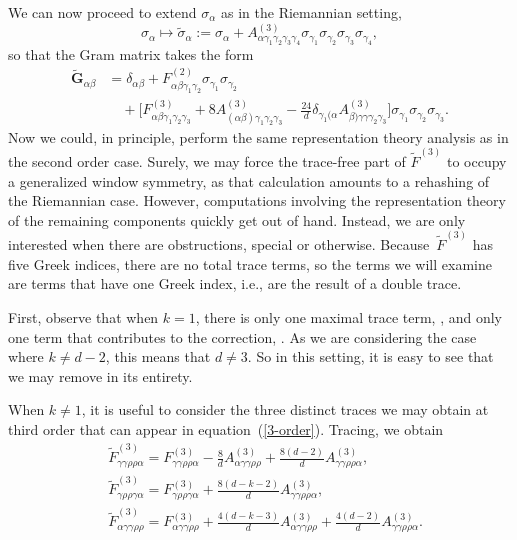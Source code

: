 \documentclass[10pt,a4paper]{article}
\numberwithin{equation}{section}
\newcommand{\bG}{\boldsymbol{G}}
\renewcommand{\=}{\stackrel \Lambda =}
\begin{document}
We can now proceed to extend $\sigma_{\alpha}$ as in the Riemannian setting,
\[\sigma_{\alpha} \mapsto \tilde{\sigma}_{\alpha} := \sigma_{\alpha} + A^{(3)}_{\alpha \gamma_1 \gamma_2 \gamma_3 \gamma_4} \sigma_{\gamma_1} \sigma_{\gamma_2} \sigma_{\gamma_3} \sigma_{\gamma_4} ,\]
so that the Gram matrix takes the form
\begin{align}
\tilde{\bG}_{\alpha \beta} &{}= \delta_{\alpha \beta}+ F^{(2)}_{\alpha \beta \gamma_1 \gamma_2} \sigma_{\gamma_1} \sigma_{\gamma_2}\nonumber \\
&\quad{}+ \biggl[F^{(3)}_{\alpha \beta \gamma_1 \gamma_2 \gamma_3} + 8 A^{(3)}_{(\alpha \beta) \gamma_1 \gamma_2 \gamma_3} - \frac{24}{d} \delta_{\gamma_1 (\alpha} A^{(3)}_{\beta) \gamma \gamma \gamma_2 \gamma_3} \biggr] \sigma_{\gamma_1} \sigma_{\gamma_2} \sigma_{\gamma_3} .\label{3-order}
\end{align}
Now we could, in principle, perform the same representation theory analysis as in the second order case. Surely, we may force the trace-free part of $\tilde{F}^{(3)}$ to occupy a generalized window symmetry, as that calculation amounts to a rehashing of the Riemannian case. However, computations involving the representation theory of the remaining components quickly get out of hand. Instead, we are only interested when there are obstructions, special or otherwise. Because~$\tilde{F}^{(3)}$ has five Greek indices, there are no total trace terms, so the terms we will examine are terms that have one Greek index, i.e., are the result of a double trace.

First, observe that when $k=1$, there is only one maximal trace term, , and only one term that contributes to the correction, . As we are considering the case where $k \neq d-2$, this means that $d \neq 3$. So in this setting, it is easy to see that we may remove  in its entirety.

When $k\neq 1$, it is useful to consider the three distinct traces we may obtain at third order that can appear in equation~(\ref{3-order}). Tracing, we obtain
\begin{align*}
&\tilde{F}^{(3)}_{\gamma \gamma \rho \rho \alpha} = F^{(3)}_{\gamma \gamma \rho \rho \alpha }- \frac{8}{d} A^{(3)}_{\alpha \gamma \gamma \rho \rho} + \frac{8(d-2)}{d} A^{(3)}_{\gamma \gamma \rho \rho \alpha} ,\\
&\tilde{F}^{(3)}_{\gamma \rho \rho \gamma \alpha} = F^{(3)}_{\gamma \rho \rho \gamma \alpha }+ \frac{8(d-k-2)}{d} A^{(3)}_{\gamma \gamma \rho \rho \alpha} ,\\
&\tilde{F}^{(3)}_{\alpha \gamma \gamma \rho \rho} = F^{(3)}_{\alpha \gamma \gamma \rho \rho}+ \frac{4(d-k-3)}{d} A^{(3)}_{\alpha \gamma \gamma \rho \rho} + \frac{4(d-2)}{d} A^{(3)}_{\gamma \gamma \rho \rho \alpha} .
\end{align*}
\end{document}
